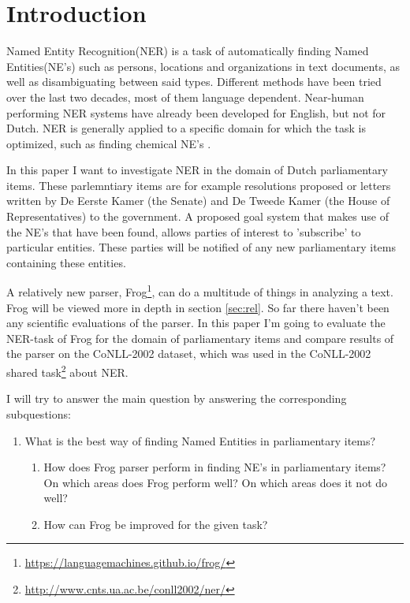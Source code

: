 \section{Introduction} \label{sec:introduction}
Named Entity Recognition(NER) is a task of automatically finding Named Entities(NE's) such as persons, locations and organizations in text documents, as well as disambiguating between said types. Different methods have been tried over the last two decades, most of them language dependent. Near-human performing NER systems have already been developed for English, but not for Dutch. NER is generally applied to a specific domain for which the task is optimized, such as finding chemical NE's \cite{rocktaschel2012chemspot}. 

In this paper I want to investigate NER in the domain of Dutch parliamentary items. These parlemntiary items are for example resolutions proposed or letters written by De Eerste Kamer (the Senate) and De Tweede Kamer (the House of Representatives) to the government. A proposed goal system that makes use of the NE's that have been found, allows parties of interest to 'subscribe' to particular entities. These parties will be notified of any new parliamentary items containing these entities. 

A relatively new parser, Frog\footnote{\url{https://languagemachines.github.io/frog/}}, can do a multitude of things in analyzing a text. Frog will be viewed more in depth in section \ref{sec:rel}. So far there haven't been any scientific evaluations of the parser. In this paper I'm going to evaluate the NER-task of Frog for the domain of parliamentary items and compare results of the parser on the CoNLL-2002 dataset, which was used in the CoNLL-2002 shared task\footnote{\url{http://www.cnts.ua.ac.be/conll2002/ner/}} about NER.

I will try to answer the main question by answering the corresponding subquestions:
\begin{enumerate}
    \item What is the best way of finding Named Entities in parliamentary items?
    \begin{enumerate}
        \item   How does Frog parser perform in finding NE's in parliamentary items?  On which areas does Frog perform well? On which areas does it not do well?
        \item How can Frog be improved for the given task?
    \end{enumerate}
\end{enumerate}



